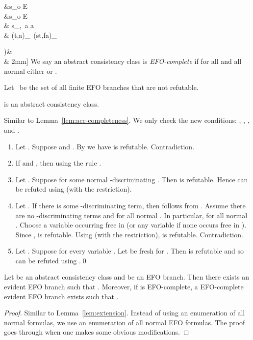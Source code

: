   &\iffdef s\in\Wff_o  \notin E\\
  &\iffdef s\in\Wff_o  \neg{}\notin E\\
  \!&\iffdef 
  s\in\Wff_\alpha,~a  
  \in a   \\
  \N{\canbe_{\sigma\tau}}&\eqdef{}
  {\forall(t,a)\in\canbe_\sigma\col~(st,fa)\in\canbe_\tau}

  \N{\mcl({\limplies}})&\eqdef{}\\
  \N{\mcl({\forall_{\!\alpha}})}&\eqdef{}
2mm]
We say an abstract consistency class  is \emph{EFO-complete}
if for all  and all normal  either  or .

Let~\emph{} be the
set of all finite EFO branches that are not refutable.
\begin{lem}
  \label{lem:acc-efo-completeness}
   is an abstract consistency class.
\end{lem}
\proof  Similar to Lemma~\ref{lem:acc-completeness}.
We only check the new conditions: , , ,
   and .
\begin{enumerate}[\AImpN]
\item[{\AImp}] Let .
  Suppose  and .
  By  we have  is refutable.  Contradiction.
\item[{\AImpN}] If  and ,
  then  using the rule .
\item[{\Aall}] Let .
  Suppose  for some normal -discriminating .
Then  is refutable.
  Hence  can be refuted using \TRFall (with the restriction).
\item[{\Aalld}] Let .
  If there is some -discriminating term, then  follows from .
  Assume there are no -discriminating terms
  and  for all normal .
  In particular,  for all normal .
  Choose a variable  occurring free in  (or any variable 
  if none occurs free in ).
  Since ,  is refutable.
  Using  (with the restriction),  is refutable.  Contradiction. \item[{\Aalln}] Let .  Suppose
   for every variable .
  Let  be fresh for .
  Then  is refutable
  and so  can be refuted using .\qed
\end{enumerate}

\begin{lem}
  \label{lem:efo-extension}
  Let  be an abstract consistency class and
   be an EFO branch.  Then there exists an evident EFO branch
   such that .  Moreover, if 
  is EFO-complete, a EFO-complete evident EFO branch  exists
  such that .
\end{lem}
\begin{proof}  Similar to Lemma~\ref{lem:extension}.  Instead of using an enumeration of all normal formulas,
  we use an enumeration of all normal EFO formulas.  The proof goes through when one makes
  some obvious modifications.
\end{proof}

